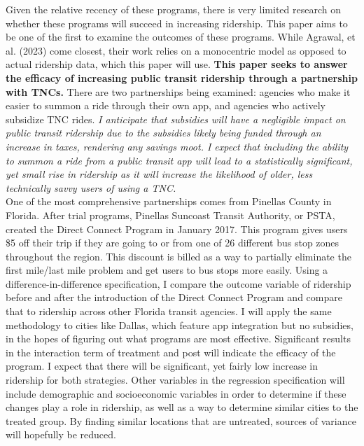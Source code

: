 \documentclass [11pt]{article}
\begin{document}

\indent Given the relative recency of these programs, there is very limited research on whether these programs will succeed in increasing ridership. This paper aims to be one of the first to examine the outcomes of these programs. While Agrawal, et al. (2023) come closest, their work relies on a monocentric model as opposed to actual ridership data, which this paper will use. \textbf{This paper seeks to answer the efficacy of increasing public transit ridership through a partnership with TNCs.} 
There are two partnerships being examined: agencies who make it easier to summon a ride through their own app, and agencies who actively subsidize TNC rides. \textit{I anticipate that subsidies will have a negligible impact on public transit ridership due to the subsidies likely being funded through an increase in taxes, rendering any savings moot. I expect that including the ability to summon a ride from a public transit app will lead to a statistically significant, yet small rise in ridership as it will increase the likelihood of older, less technically savvy users of using a TNC.} \\


\indent One of the most comprehensive partnerships comes from Pinellas County in Florida. After trial programs, Pinellas Suncoast Transit Authority, or PSTA, created the Direct Connect Program in January 2017. This program gives users \$5 off their trip if they are going to or from one of 26 different bus stop zones throughout the region. This discount is billed as a way to partially eliminate the first mile/last mile problem and get users to bus stops more easily. Using a difference-in-difference specification, I compare the outcome variable of ridership before and after the introduction of the Direct Connect Program and compare that to ridership across other Florida transit agencies. I will apply the same methodology to cities like Dallas, which feature app integration but no subsidies, in the hopes of figuring out what programs are most effective. Significant results in the interaction term of treatment and post will indicate the efficacy of the program. I expect that there will be significant, yet fairly low increase in ridership for both strategies. Other variables in the regression specification will include demographic and socioeconomic variables in order to determine if these changes play a role in ridership, as well as a way to determine similar cities to the treated group. By finding similar locations that are untreated, sources of variance will hopefully be reduced.\\
\end{document}
